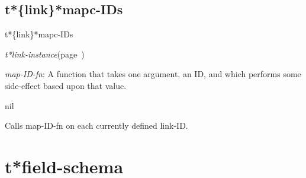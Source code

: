 \subsection{t*\{link\}*mapc-IDs}
\label{t*link*mapc-IDs}

\begin{description}
\item [Name:]  t*\{link\}*mapc-IDs

\item [Class:] {\sl t*link-instance}\hfill(page~\pageref{t*link-instance})

\item [Parameters:]
\item {\sl map-ID-fn}:  A function that takes one argument, an ID,
and which performs some side-effect based upon that
value.



\item [Return-value:] nil

\item [Description:]

Calls map-ID-fn on each currently defined link-ID.

\item [Public:]



\end{description}
\horizontalline

\section{t*field-schema}
\label{t*field-schema}

